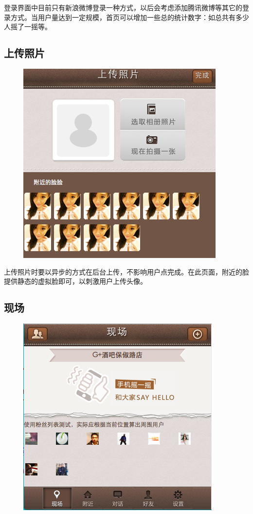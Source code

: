 \documentclass[cs4size]{ctexartutf8}
\begin{document}
登录界面中目前只有新浪微博登录一种方式，以后会考虑添加腾讯微博等其它的登录方式。当用户量达到一定规模，首页可以增加一些总的统计数字：如总共有多少人摇了一摇等。

\subsection{上传照片}

\begin{figure}[H]
\centering
\includegraphics[scale=0.5]{./2.png}
\end{figure}

上传照片时要以异步的方式在后台上传，不影响用户点完成。在此页面，附近的脸提供静态的虚拟脸即可，以刺激用户上传头像。

\subsection{现场}

\begin{figure}[H]
\centering
\includegraphics[scale=0.5]{./3.png}
\end{figure}
\end{document}
